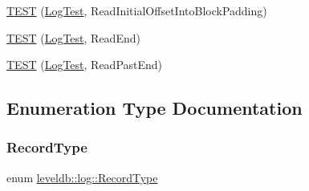\begin{DoxyCompactItemize}
\item 
\mbox{\hyperlink{namespaceleveldb_1_1log_af4f391a0323192a38607f4943e4b1dd4}{T\+E\+ST}} (\mbox{\hyperlink{classleveldb_1_1log_1_1_log_test}{Log\+Test}}, Read\+Initial\+Offset\+Into\+Block\+Padding)
\item 
\mbox{\hyperlink{namespaceleveldb_1_1log_a74e0fb6c39041d1ef2193114b0a2275b}{T\+E\+ST}} (\mbox{\hyperlink{classleveldb_1_1log_1_1_log_test}{Log\+Test}}, Read\+End)
\item 
\mbox{\hyperlink{namespaceleveldb_1_1log_ae1081d375c33d8b2f01d5593ecd5f4a7}{T\+E\+ST}} (\mbox{\hyperlink{classleveldb_1_1log_1_1_log_test}{Log\+Test}}, Read\+Past\+End)
\end{DoxyCompactItemize}


\subsection{Enumeration Type Documentation}
\mbox{\label{namespaceleveldb_1_1log_a01bdc1b51beb634f14f8fbb70fbd8d2a}} 
\subsubsection{\texorpdfstring{RecordType}{RecordType}}
{\footnotesize\ttfamily enum \mbox{\hyperlink{namespaceleveldb_1_1log_a01bdc1b51beb634f14f8fbb70fbd8d2a}{leveldb\+::log\+::\+Record\+Type}}}


